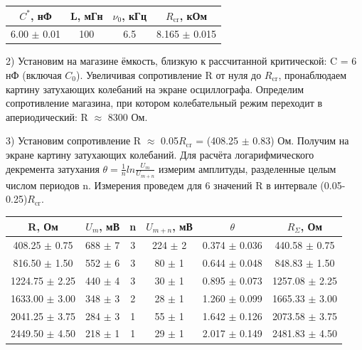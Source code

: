 \documentclass[a4paper,12pt]{article}
\begin{document}
\begin{center}
\begin{tabular}{|c|c|c|c|}
	\hline
	$C^*$, нФ & L, мГн & $\nu_0$, кГц & $R_{\text{cr}}$, кОм \\
	\hline
	6.00  $\pm$ 0.01 & 100 & 6.5 & 8.165 $\pm$ 0.015 \\
	\hline
\end{tabular}
\end{center}

\par 2) Установим на магазине ёмкость, близкую к рассчитанной критической: C = 6 нФ (включая $C_0$). Увеличивая сопротивление R от нуля до $R_{\text{cr}}$, пронаблюдаем картину затухающих колебаний на экране осциллографа. Определим сопротивление магазина, при котором колебательный режим переходит в апериодический: R $\approx$ 8300 Ом. 

\par 3) Установим сопротивление R $\approx$ 0.05$R_{\text{cr}}$ = (408.25 $\pm$ 0.83) Ом. Получим на экране картину затухающих колебаний. Для расчёта логарифмического декремента затухания $\theta = \frac{1}{n}ln\frac{U_m}{U_{m+n}}$ измерим амплитуды, разделенные целым числом периодов n. Измерения проведем для 6 значений R в интервале (0.05-0.25)$R_{\text{cr}}$. 

\begin{center}
\begin{tabular}{|c|c|c|c|c|c|}
	\hline
	R, Ом & $U_m$, мВ & n & $U_{m+n}$, мВ & $\theta$ & $R_{\Sigma}$, Ом\\
	\hline
	408.25 $\pm$ 0.75 & 688 $\pm$ 7 & 3 & 224 $\pm$ 2 & 0.374 $\pm$ 0.036 & 440.58 $\pm$ 0.75 \\
	\hline
	816.50 $\pm$ 1.50 & 552 $\pm$ 6 & 3 & 80 $\pm$ 1 & 0.644 $\pm$ 0.048 & 848.83 $\pm$ 1.50\\
	\hline
	1224.75 $\pm$ 2.25 & 440 $\pm$ 4 & 3 & 30 $\pm$ 1 & 0.895 $\pm$ 0.073 & 1257.08 $\pm$ 2.25\\
	\hline
	1633.00 $\pm$ 3.00 & 348 $\pm$ 3 & 2 & 28 $\pm$ 1 & 1.260 $\pm$ 0.099 & 1665.33 $\pm$ 3.00\\
	\hline
	2041.25 $\pm$ 3.75 & 284 $\pm$ 3 & 1 & 55 $\pm$ 1 & 1.642 $\pm$ 0.126 & 2073.58 $\pm$ 3.75\\
	\hline
	2449.50 $\pm$ 4.50 & 218 $\pm$ 1 & 1 & 29 $\pm$ 1 & 2.017 $\pm$ 0.149 & 2481.83 $\pm$ 4.50\\
	\hline
\end{tabular}
\end{center}
\end{document}
